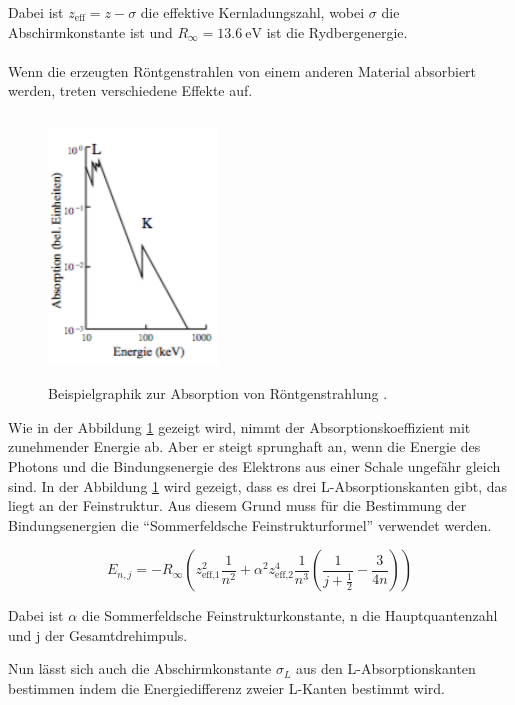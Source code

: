 Dabei ist $z_\text{eff} = z - \sigma$ die effektive Kernladungszahl, wobei $\sigma$
die Abschirmkonstante ist und $R_\infty = \SI{13.6}{\eV}$ ist die
Rydbergenergie. \\\\

Wenn die erzeugten Röntgenstrahlen von einem anderen Material absorbiert werden,
treten verschiedene Effekte auf.

\begin{figure}[H]
  \centering
  \includegraphics[width=0.4\textwidth, height=7cm]{content/Absorption.png}
  \caption[width=\linewidth]{Beispielgraphik zur Absorption von Röntgenstrahlung \cite{1}.}
  \label{abb:1}
\end{figure}

Wie in der Abbildung \ref{abb:1} gezeigt wird, nimmt der Absorptionskoeffizient
mit zunehmender Energie ab. Aber er steigt sprunghaft an, wenn die Energie des Photons
und die Bindungsenergie des Elektrons aus einer Schale ungefähr gleich sind.
In der Abbildung \ref{abb:1} wird gezeigt, dass es drei L-Absorptionskanten
gibt, das liegt an der Feinstruktur. Aus diesem Grund muss für die Bestimmung der
Bindungsenergien die \enquote{Sommerfeldsche Feinstrukturformel} verwendet werden.

\begin{equation}
  E_{n,j} = - R_\infty \left( z_\text{eff,1}^2 \frac{1}{n^2} + \alpha^2
  z_\text{eff,2}^4 \frac{1}{n^3} \left( \frac{1}{j+\frac{1}{2}} - \frac{3}{4n}
  \right)\right)
  \label{eq:3}
\end{equation}

Dabei ist $\alpha$ die Sommerfeldsche Feinstrukturkonstante, n die Hauptquantenzahl
und j der Gesamtdrehimpuls.

Nun lässt sich auch die Abschirmkonstante $\sigma_L$ aus den L-Absorptionskanten
bestimmen indem die Energiedifferenz zweier L-Kanten bestimmt wird.

